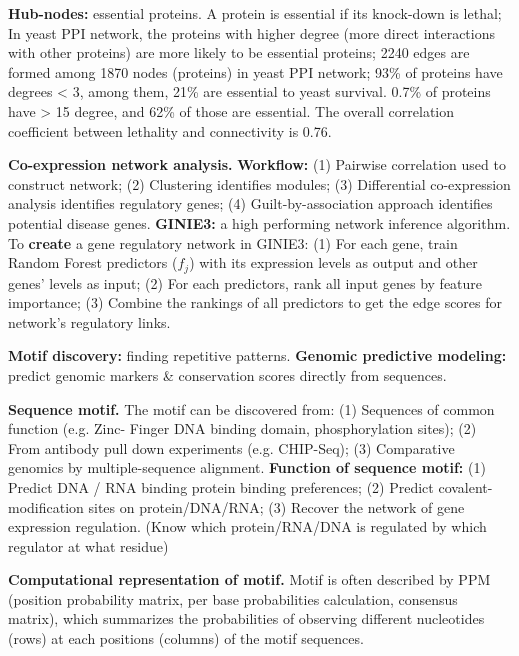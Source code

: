 \vspace{0.1em}\noindent
\textbf{Hub-nodes:} essential proteins. A protein is essential if its knock-down is lethal; In yeast PPI network, the proteins with higher degree (more direct interactions with other proteins) are more likely to be essential proteins; 2240 edges are formed among 1870 nodes (proteins) in yeast PPI network; 93\% of proteins have degrees < 3, among them, 21\% are essential to yeast survival. 0.7\% of proteins have > 15 degree, and 62\% of those are essential. The overall correlation coefficient between lethality and connectivity is 0.76.

\vspace{0.1em}\noindent
\textbf{Co-expression network analysis.} \textbf{Workflow:} (1) Pairwise correlation used to construct network; (2) Clustering identifies modules; (3) Differential co-expression analysis identifies regulatory genes; (4) Guilt-by-association approach identifies potential disease genes. \textbf{GINIE3:} a high performing network inference algorithm. To \textbf{create} a gene regulatory network in GINIE3: (1) For each gene, train Random Forest predictors ($f_j$) with its expression levels as output and other genes' levels as input; (2) For each predictors, rank all input genes by feature importance; (3) Combine the rankings of all predictors to get the edge scores for network's regulatory links.

\vspace{0.1em}\noindent
\textbf{Motif discovery:} finding repetitive patterns. \textbf{Genomic predictive modeling:} predict genomic markers \& conservation scores directly from sequences.

\vspace{0.1em}\noindent
\textbf{Sequence motif.} The motif can be discovered from: (1) Sequences of common function (e.g. Zinc- Finger DNA binding domain, phosphorylation sites); (2) From antibody pull down experiments (e.g. CHIP-Seq); (3) Comparative genomics by multiple-sequence alignment. \textbf{Function of sequence motif:} (1) Predict DNA / RNA binding protein binding preferences; (2) Predict covalent-modification sites on protein/DNA/RNA; (3) Recover the network of gene expression regulation. (Know which protein/RNA/DNA is regulated by which regulator at what residue)

\vspace{0.1em}\noindent
\textbf{Computational representation of motif.} Motif is often described by PPM (position probability matrix, per base probabilities calculation, consensus matrix), which summarizes the probabilities of observing different nucleotides (rows) at each positions (columns) of the motif sequences.

